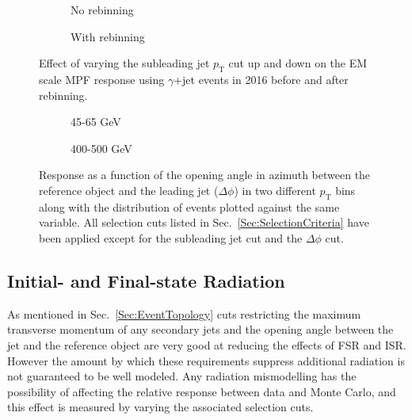 \begin{figure}[!ht]
\centering
\begin{subfigure}{.5\textwidth}
\centering
{}
\caption{No rebinning}
\end{subfigure}%
\begin{subfigure}{.5\textwidth}  \centering
{}
\caption{With rebinning}
\end{subfigure}
\caption{Effect of varying the subleading jet $p_{\mathrm T}$ cut up and down on the EM scale MPF response using $\gamma$+jet events in 2016 before and after rebinning. }
\label{Fig:dPhiGJetEM2016}
\end{figure}

\begin{figure}[!ht]
\centering
\begin{subfigure}{.5\textwidth}
\centering
{}
\caption{45-65 GeV}
\end{subfigure}%
\begin{subfigure}{.5\textwidth}
\centering
{}
\caption{400-500 GeV}
\end{subfigure}
\caption{Response as a function of the opening angle in azimuth between the reference object and the leading jet ($\Delta\phi$) in two different $p_{\mathrm T}$ bins along with the distribution of events plotted against the same variable.  All selection cuts listed in Sec.~\ref{Sec:SelectionCriteria} have been applied except for the subleading jet cut and the $\Delta\phi$ cut.  }
\label{Fig:RespVsdPhiGJetEM2016}
\end{figure}

\subsection{Initial- and Final-state Radiation}
As mentioned in Sec.~\ref{Sec:EventTopology} cuts restricting the maximum transverse momentum of any secondary jets and the opening angle between the jet and the reference object are very good at reducing the effects of FSR and ISR.
However the amount by which these requirements suppress additional radiation is not guaranteed to be well modeled.
Any radiation mismodelling has the possibility of affecting the relative response between data and Monte Carlo, and this effect is measured by varying the associated selection cuts. 


